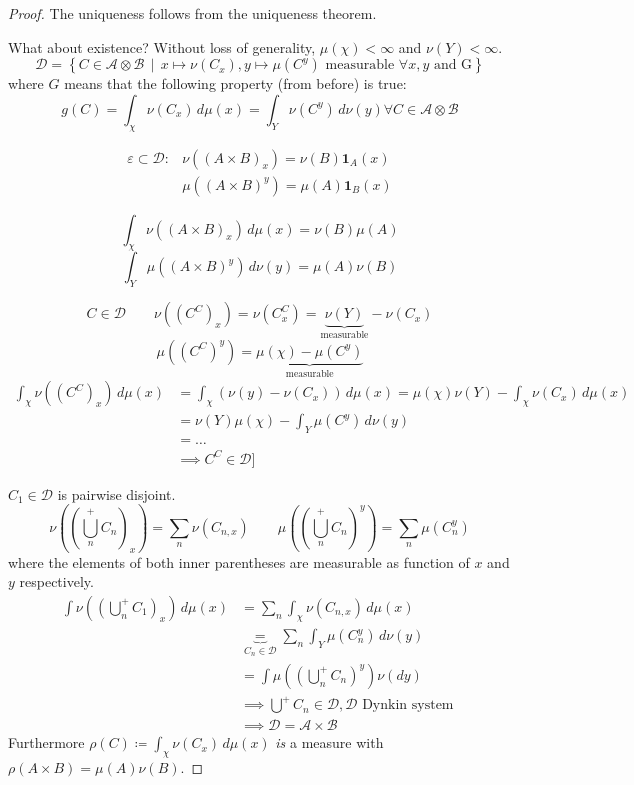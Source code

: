 \documentclass[a4paper]{article}
\numberwithin{lecref}{section}
\theoremstyle{break}
\newcommand{\SetDef}[2]{\left\{#1\,\mid\,#2\right\}}
\begin{document}
\begin{proof}
  The uniqueness follows from the uniqueness theorem.

  What about existence? Without loss of generality, $\mu(\chi) < \infty$ and $\nu(Y) < \infty$.
  \[
    \mathcal D = \SetDef{C \in \mathcal A \otimes \mathcal B}%
      {x \mapsto \nu(C_x), y \mapsto \mu(C^y) \text{ measurable }\forall x, y \text{ and G}}
  \]
  where $G$ means that the following property (from before) is true:
  \[ g(C) = \int_\chi \nu(C_x) \, d\mu(x) = \int_Y \nu(C^y) \, d\nu(y) \forall C \in \mathcal A \otimes \mathcal B \]

  \begin{align*}
    \varepsilon \subset \mathcal D:
      & \nu((A \times B)_x) = \nu(B) \mathbf{1}_A(x) \\
      & \mu((A \times B)^y) = \mu(A) \mathbf{1}_B(x)
  \end{align*}

  \[ \int_{\chi} \nu((A \times B)_x) \, d\mu(x) = \nu(B) \mu(A) \]
  \[ \int_{Y} \mu((A \times B)^y) \, d\nu(y) = \mu(A) \nu(B) \]

  \[ C \in \mathcal D \qquad \nu\left((C^C)_x\right) = \nu(C_x^C) = \underbrace{\nu(Y)}_{\text{measurable}} - \nu(C_x) \]
  \[ \mu((C^C)^y) = \underbrace{\mu(\chi) - \mu(C^y)}_{\text{measurable}} \]
  \begin{align*}
    \int_\chi \nu((C^C)_x) \, d\mu(x)
      &= \int_\chi \left(\nu(y) - \nu(C_x)\right) \, d\mu(x) = \mu(\chi) \nu(Y) - \int_\chi \nu(C_x) \, d\mu(x) \\
      &= \nu(Y) \mu(\chi) - \int_Y \mu(C^y) \, d\nu(y) \\
      &= \dots \\
      &\implies C^C \in \mathcal D]
  \end{align*}

  $C_1 \in \mathcal D$ is pairwise disjoint.
  \[ \nu\left(\left(\bigcup_n^+ C_n\right)_x\right) = \sum_n \nu(C_{n,x}) \qquad \mu\left(\left(\bigcup_n^+ C_n\right)^y\right) = \sum_n \mu(C_n^y) \]
  where the elements of both inner parentheses are measurable as function of $x$ and $y$ respectively.
  \begin{align*}
    \int \nu\left(\left(\bigcup_n^+ C_1\right)_x\right) \, d\mu(x)
      &= \sum_n \int_\chi \nu(C_{n,x}) \, d\mu(x) \\
      &\underbrace{=}_{C_n \in \mathcal D} \sum_n \int_Y \mu(C_n^y) \, d\nu(y) \\
      &= \int \mu\left(\left(\bigcup_n^+ C_n\right)^y\right) \nu(dy) \\
      &\implies \bigcup^+ C_n \in \mathcal D, \mathcal D \text{ Dynkin system } \\
      &\implies \mathcal D = \mathcal A \times \mathcal B
  \end{align*}
  Furthermore $\rho(C) \coloneqq \int_\chi \nu(C_x) \, d\mu(x)$ \emph{is} a measure with $\rho(A \times B) = \mu(A) \nu(B)$.
\end{proof}
\end{document}
